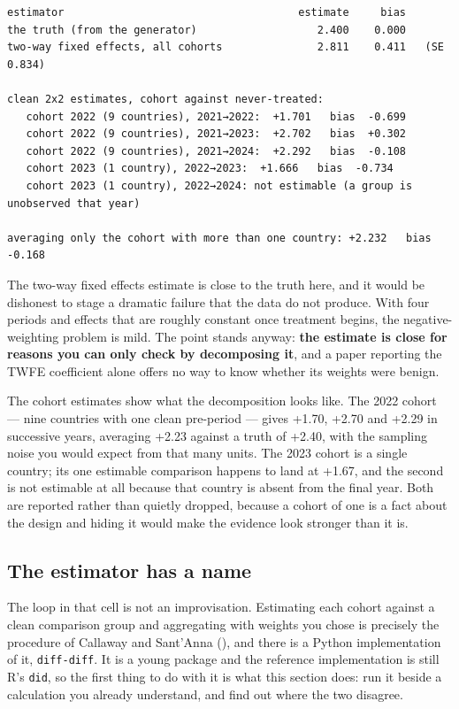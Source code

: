 \documentclass[
  letterpaper,
  10pt,
  twoside,
  openright,
  numbers=noenddot,
  chapterprefix=true]{scrbook}
\begin{document}
\begin{verbatim}
estimator                                     estimate     bias
the truth (from the generator)                   2.400    0.000
two-way fixed effects, all cohorts               2.811    0.411   (SE 0.834)

clean 2x2 estimates, cohort against never-treated:
   cohort 2022 (9 countries), 2021→2022:  +1.701   bias  -0.699
   cohort 2022 (9 countries), 2021→2023:  +2.702   bias  +0.302
   cohort 2022 (9 countries), 2021→2024:  +2.292   bias  -0.108
   cohort 2023 (1 country), 2022→2023:  +1.666   bias  -0.734
   cohort 2023 (1 country), 2022→2024: not estimable (a group is unobserved that year)

averaging only the cohort with more than one country: +2.232   bias -0.168
\end{verbatim}

The two-way fixed effects estimate is close to the truth here, and it
would be dishonest to stage a dramatic failure that the data do not
produce. With four periods and effects that are roughly constant once
treatment begins, the negative-weighting problem is mild. The point
stands anyway: \textbf{the estimate is close for reasons you can only
check by decomposing it}, and a paper reporting the TWFE coefficient
alone offers no way to know whether its weights were benign.

The cohort estimates show what the decomposition looks like. The 2022
cohort --- nine countries with one clean pre-period --- gives +1.70,
+2.70 and +2.29 in successive years, averaging +2.23 against a truth of
+2.40, with the sampling noise you would expect from that many units.
The 2023 cohort is a single country; its one estimable comparison
happens to land at +1.67, and the second is not estimable at all because
that country is absent from the final year. Both are reported rather
than quietly dropped, because a cohort of one is a fact about the design
and hiding it would make the evidence look stronger than it is.

\subsection{The estimator has a name}\label{the-estimator-has-a-name}

The loop in that cell is not an improvisation. Estimating each cohort
against a clean comparison group and aggregating with weights you chose
is precisely the procedure of Callaway and Sant'Anna
(), and there is a Python
implementation of it, \texttt{diff-diff}. It is a young package and the
reference implementation is still R's \texttt{did}, so the first thing
to do with it is what this section does: run it beside a calculation you
already understand, and find out where the two disagree.
\end{document}
